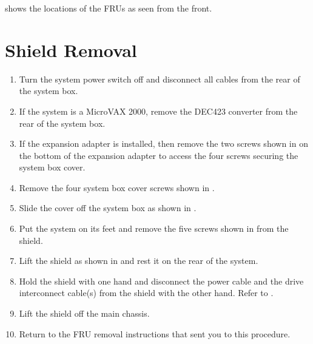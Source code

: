 \newpage

 shows the locations of the FRUs as seen from the front.


\newpage

\section{Shield Removal}

\begin{enumerate}

\item	Turn the system power switch off and disconnect all cables from the
		rear of the system box.

\item	If the system is a MicroVAX 2000, remove the DEC423 converter from
		the rear of the system box.

\item	If the expansion adapter is installed, then remove the two screws shown
		in  on the bottom of the expansion adapter to access the four
		screws securing the system box cover.

\newpage

\item	Remove the four system box cover screws shown in .

\newpage

\item	Slide the cover off the system box as shown in .

\newpage

\item	Put the system on its feet and remove the five screws shown in
		 from the shield.

\newpage

\item	Lift the shield as shown in  and rest it on the rear of the
		system.

\newpage

\item	Hold the shield with one hand and disconnect the power cable and the
		drive interconnect cable(s) from the shield with the other hand. Refer
		to .


\item	Lift the shield off the main chassis.

\item	Return to the FRU removal instructions that sent you to this procedure.
\end{enumerate}

